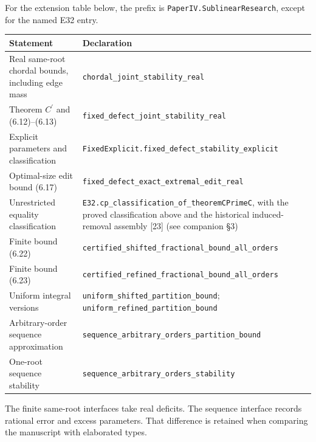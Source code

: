 \documentclass[english,11pt,a4paper]{article}
\newcounter{none}
\begin{document}
For the extension table below, the prefix is
\nolinkurl{PaperIV.SublinearResearch}, except for the named E32 entry.

{\def\LTcaptype{none} %
\begin{longtable}[]{@{}
  >{\raggedright\arraybackslash}p{}
  >{\raggedright\arraybackslash}p{}@{}}
\toprule\noalign{}
\begin{minipage}[b]{\linewidth}\raggedright
Statement
\end{minipage} & \begin{minipage}[b]{\linewidth}\raggedright
Declaration
\end{minipage} \\
\midrule\noalign{}
\endhead
\bottomrule\noalign{}
\endlastfoot
Real same-root chordal bounds, including edge mass &
\nolinkurl{chordal_joint_stability_real} \\
Theorem \(C^\prime\) and (6.12)--(6.13) &
\nolinkurl{fixed_defect_joint_stability_real} \\
Explicit parameters and classification &
\nolinkurl{FixedExplicit.fixed_defect_stability_explicit} \\
Optimal-size edit bound (6.17) &
\nolinkurl{fixed_defect_exact_extremal_edit_real} \\
Unrestricted equality classification &
\nolinkurl{E32.cp_classification_of_theoremCPrimeC}, with the proved
classification above and the historical induced-removal assembly
{[}23{]} (see companion §3) \\
Finite bound (6.22) &
\nolinkurl{certified_shifted_fractional_bound_all_orders} \\
Finite bound (6.23) &
\nolinkurl{certified_refined_fractional_bound_all_orders} \\
Uniform integral versions & \nolinkurl{uniform_shifted_partition_bound};
\nolinkurl{uniform_refined_partition_bound} \\
Arbitrary-order sequence approximation &
\nolinkurl{sequence_arbitrary_orders_partition_bound} \\
One-root sequence stability &
\nolinkurl{sequence_arbitrary_orders_stability} \\
\end{longtable}
}

The finite same-root interfaces take real deficits. The sequence
interface records rational error and excess parameters. That difference
is retained when comparing the manuscript with elaborated types.
\end{document}
